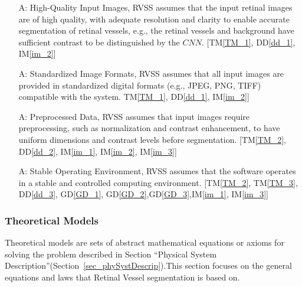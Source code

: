 \documentclass[12pt]{article}
\newcommand{\dref}[1]{GD\ref{#1}}
\newcommand{\ddref}[1]{DD\ref{#1}}
\newcommand{\tref}[1]{TM\ref{#1}}
\newcounter{assumpnum} %
\newcommand{\iref}[1]{IM\ref{#1}}
\begin{document}
\begin{itemize}

\item[A\refstepcounter{assumpnum}\theassumpnum \label{A_1}:] High-Quality Input Images, RVSS assumes that the input retinal images are of high quality, with adequate resolution and clarity to enable accurate segmentation of retinal vessels, e.g., the retinal vessels and background have sufficient contrast to be distinguished by the $CNN$. [\tref{TM_1}, \ddref{dd_1}, \iref{im_2}] 

\item[A\refstepcounter{assumpnum}\theassumpnum \label{A_2}:] Standardized Image Formats, RVSS assumes that all input images are provided in standardized digital formats (e.g., JPEG, PNG, TIFF) compatible with the system. \tref{TM_1}, \ddref{dd_1}, \iref{im_2}] 

\item[A\refstepcounter{assumpnum}\theassumpnum \label{A_3}:] Preprocessed Data, RVSS assumes that input images require preprocessing, such as normalization and contrast enhancement, to have uniform dimensions and contrast levels before segmentation. [\tref{TM_2}, \ddref{dd_2}, \iref{im_1}, \iref{im_2}, \iref{im_3}] 


\item[A\refstepcounter{assumpnum}\theassumpnum \label{A_4}:]Stable Operating Environment, RVSS assumes that the software operates in a stable and controlled computing environment. [\tref{TM_2}, \tref{TM_3}, \ddref{dd_3}, \dref{GD_1}, \dref{GD_2},\dref{GD_3},\iref{im_1}, \iref{im_3}] 


\end{itemize}



\subsubsection{Theoretical Models}\label{sec_theoretical}

Theoretical models are sets of abstract mathematical equations or axioms for solving the problem described in Section ``Physical System Description''(Section~\ref{sec_phySystDescrip}).This section focuses on the general equations and laws that Retinal Vessel segmentation is based on.


~\newline
\end{document}
